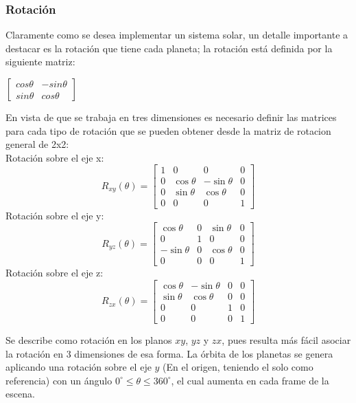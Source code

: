 \documentclass[12pt,journal,compsoc]{IEEEtran}
\begin{document}
\subsubsection{Rotación}
Claramente como se desea implementar un sistema solar, un detalle importante a destacar es la rotación que tiene cada planeta; la rotación está definida por la siguiente matriz:
\begin{center}
$
\begin{bmatrix}
cos\theta & -sin\theta \\
sin\theta & cos\theta 
\end{bmatrix}
$
\end{center}
En vista de que se trabaja en tres dimensiones es necesario definir las matrices para cada tipo de rotación que se pueden obtener desde la matriz de rotacion general de 2x2:\\
Rotación sobre el eje x:\\
\[
	R_{xy}(\theta) = \left[ 
		\begin{array}{cccc}
			1 & 0 & 0 & 0 \\
			0 & \cos\theta & -\sin\theta & 0 \\
			0 & \sin\theta & \cos\theta & 0 \\
			0 & 0 & 0 & 1
		\end{array}
	\right]
\]
Rotación sobre el eje y:\\
\[
	R_{yz}(\theta) = \left[ 
		\begin{array}{cccc}
			\cos\theta & 0 & \sin\theta & 0 \\
			0 & 1 & 0 & 0 \\
			-\sin\theta & 0 & \cos\theta & 0 \\
			0 & 0 & 0 & 1
		\end{array}
	\right]	
\]
Rotación sobre el eje z:\\
\[
	R_{zx}(\theta) = \left[ 
		\begin{array}{cccc}
			\cos\theta & -\sin\theta & 0 & 0 \\
			\sin\theta & \cos\theta & 0 & 0 \\
			0 & 0 & 1 & 0 \\
			0 & 0 & 0 & 1
		\end{array}
	\right]	
\]

Se describe como rotación en los planos $xy$, $yz$ y $zx$, pues resulta más fácil asociar la rotación en 3 dimensiones de esa forma. La órbita de los planetas se genera aplicando una rotación sobre el eje $y$ (En el origen, teniendo el solo como referencia) con un ángulo $0^{\circ}\leq\theta\leq360^{\circ}$, el cual aumenta en cada frame de la escena.
\end{document}
